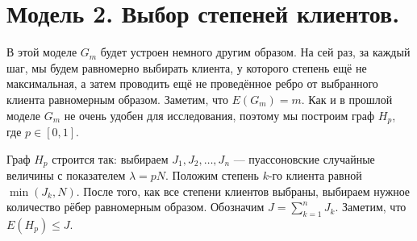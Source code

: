\documentclass{matmex-diploma-custom}
\newcommand{\leqs}{\leqslant}
\theoremstyle{named}
\begin{document}
\newpage
\section*{Модель 2. Выбор степеней клиентов.}
В этой моделе $G_m$ будет устроен немного другим образом. На сей раз, за каждый шаг, мы будем равномерно выбирать клиента, 
у которого степень ещё не максимальная, а затем проводить ещё не проведённое ребро от выбранного клиента равномерным образом.
Заметим, что $E(G_m) = m$. Как и в прошлой моделе $G_m$ не очень удобен для исследования, поэтому мы построим граф $H_p$, где $p \in [0,1]$.

Граф $H_p$ строится так: выбираем $J_1, J_2, \dots, J_n$ --- пуассоновские случайные величины с показателем $\lambda = pN$.
Положим степень $k$-го клиента равной $\min(J_k, N)$. После того, как все степени клиентов выбраны, 
выбираем нужное количество рёбер равномерным образом. Обозначим $J = \sum\limits_{k=1}^n J_k$. Заметим, что $E(H_p) \leqs J$.
\end{document}
